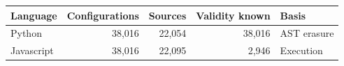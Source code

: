 \begin{tabular}{@{}lrrrl@{}}
\toprule
Language & Configurations & Sources & Validity known & Basis \\
\midrule
Python & 38,016 & 22,054 & 38,016 & AST erasure \\
Javascript & 38,016 & 22,095 & 2,946 & Execution \\
\bottomrule
\end{tabular}
